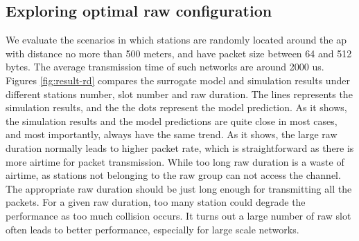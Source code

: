 



\subsection{Exploring optimal \gls{raw} configuration}


We evaluate the scenarios in which stations are randomly located around the \gls{ap} with distance no more than 500 meters, and have packet size between 64 and 512 bytes. The average transmission time of such networks are around 2000 us. Figures \ref{fig:result-rd} compares the surrogate model and simulation results under different stations number, slot number and \gls{raw} duration. The lines represents the simulation results, and the the dots represent the  model prediction. As it shows, the simulation results and the model predictions are quite close in most cases, and most importantly, always have the same trend. As it shows, the large \gls{raw} duration normally leads to higher packet rate, which is straightforward as there is more airtime for packet transmission. While too long \gls{raw} duration is a waste of airtime, as stations not belonging to the \gls{raw} group can not access the channel. The appropriate \gls{raw} duration should be just long enough for transmitting all the packets. For a given \gls{raw} duration, too many station could degrade the performance as too much collision occurs.
It turns out a large number of \gls{raw} slot often leads to better performance, especially for large scale networks.


